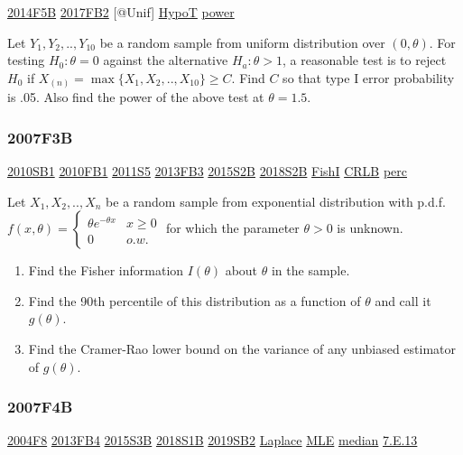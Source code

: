 \documentclass[10pt,twocolumn,portrait]{article}
\begin{document}
\protect\hyperlink{f5b-1}{2014F5B} \protect\hyperlink{fb2-3}{2017FB2}
{[}@Unif{]} \protect\hyperlink{HypoT}{HypoT}
\protect\hyperlink{power}{power}

Let \(Y_1,Y_2,..,Y_{10}\) be a random sample from uniform distribution
over \((0,\theta)\). For testing \(H_0:\theta=0\) against the
alternative \(H_a:\theta>1\), a reasonable test is to reject \(H_0\) if
\(X_{(n)}=\max\{X_1,X_2,..,X_{10}\}\ge C\). Find \(C\) so that type I
error probability is .05. Also find the power of the above test at
\(\theta=1.5\).

\hypertarget{f3b}{%
\subsubsection{2007F3B}\label{f3b}}

\protect\hyperlink{sb1-1}{2010SB1} \protect\hyperlink{fb1-1}{2010FB1}
\protect\hyperlink{s5-2}{2011S5} \protect\hyperlink{fb3-2}{2013FB3}
\protect\hyperlink{s2b-1}{2015S2B} \protect\hyperlink{s2b-2}{2018S2B}
\protect\hyperlink{section-5}{FishI} \protect\hyperlink{section-5}{CRLB}
\protect\hyperlink{perc}{perc}

Let \(X_1,X_2,..,X_n\) be a random sample from exponential distribution
with p.d.f.
\(f(x,\theta)=\begin{cases}\theta e^{-\theta x}& x\ge0\\0& o.w.\end{cases}\)
for which the parameter \(\theta>0\) is unknown.

\begin{enumerate}
\def\labelenumi{(\alph{enumi})}
\item
  Find the Fisher information \(I(\theta)\) about \(\theta\) in the
  sample.
\item
  Find the 90th percentile of this distribution as a function of
  \(\theta\) and call it \(g(\theta)\).
\item
  Find the Cramer-Rao lower bound on the variance of any unbiased
  estimator of \(g(\theta)\).
\end{enumerate}

\hypertarget{f4b}{%
\subsubsection{2007F4B}\label{f4b}}

\protect\hyperlink{f8-2}{2004F8} \protect\hyperlink{fb4-2}{2013FB4}
\protect\hyperlink{s3b-1}{2015S3B} \protect\hyperlink{s1b-2}{2018S1B}
\protect\hyperlink{sb2-3}{2019SB2} \protect\hyperlink{Laplace}{Laplace}
\protect\hyperlink{MLE}{MLE} \protect\hyperlink{median}{median}
\protect\hyperlink{e.13}{7.E.13}
\end{document}
